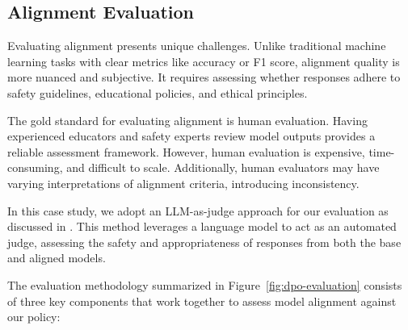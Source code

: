 \subsection{Alignment Evaluation}

Evaluating alignment presents unique challenges. Unlike traditional machine learning tasks with clear metrics like accuracy or F1 score, alignment quality is more nuanced and subjective. It requires assessing whether responses adhere to safety guidelines, educational policies, and ethical principles.

The gold standard for evaluating alignment is human evaluation. Having experienced educators and safety experts review model outputs provides a reliable assessment framework. However, human evaluation is expensive, time-consuming, and difficult to scale. Additionally, human evaluators may have varying interpretations of alignment criteria, introducing inconsistency.

In this case study, we adopt an LLM-as-judge approach for our evaluation as discussed in . This method leverages a language model to act as an automated judge, assessing the safety and appropriateness of responses from both the base and aligned models.

The evaluation methodology summarized in Figure~\ref{fig:dpo-evaluation} consists of three key components that work together to assess model alignment against our policy:

